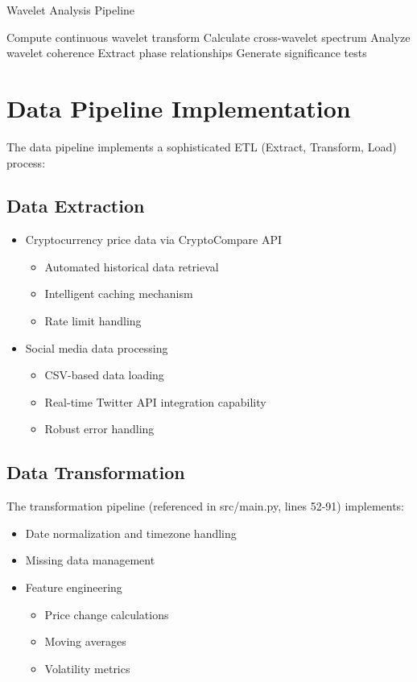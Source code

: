 \documentclass[12pt,a4paper]{report}
\begin{document}
\begin{algorithm}
    \caption{Wavelet Analysis Pipeline}
    \begin{algorithmic}[1]
        \State Compute continuous wavelet transform
        \State Calculate cross-wavelet spectrum
        \State Analyze wavelet coherence
        \State Extract phase relationships
        \State Generate significance tests
    \end{algorithmic}
\end{algorithm}

\section{Data Pipeline Implementation}
The data pipeline implements a sophisticated ETL (Extract, Transform, Load) process:

\subsection{Data Extraction}
\begin{itemize}
    \item Cryptocurrency price data via CryptoCompare API
        \begin{itemize}
            \item Automated historical data retrieval
            \item Intelligent caching mechanism
            \item Rate limit handling
        \end{itemize}
    \item Social media data processing
        \begin{itemize}
            \item CSV-based data loading
            \item Real-time Twitter API integration capability
            \item Robust error handling
        \end{itemize}
\end{itemize}

\subsection{Data Transformation}
The transformation pipeline (referenced in src/main.py, lines 52-91) implements:
\begin{itemize}
    \item Date normalization and timezone handling
    \item Missing data management
    \item Feature engineering
        \begin{itemize}
            \item Price change calculations
            \item Moving averages
            \item Volatility metrics
        \end{itemize}
\end{itemize}
\end{document}
